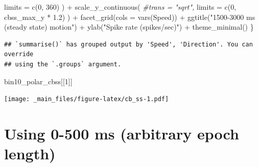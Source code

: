 \documentclass[
]{book}
\newenvironment{Shaded}{\begin{snugshade}}{\end{snugshade}}
\newcommand{\AttributeTok}[1]{\textcolor[rgb]{0.77,0.63,0.00}{#1}}
\newcommand{\CommentTok}[1]{\textcolor[rgb]{0.56,0.35,0.01}{\textit{#1}}}
\newcommand{\DecValTok}[1]{\textcolor[rgb]{0.00,0.00,0.81}{#1}}
\newcommand{\FloatTok}[1]{\textcolor[rgb]{0.00,0.00,0.81}{#1}}
\newcommand{\FunctionTok}[1]{\textcolor[rgb]{0.00,0.00,0.00}{#1}}
\newcommand{\NormalTok}[1]{#1}
\newcommand{\SpecialCharTok}[1]{\textcolor[rgb]{0.00,0.00,0.00}{#1}}
\newcommand{\StringTok}[1]{\textcolor[rgb]{0.31,0.60,0.02}{#1}}
\begin{document}
\begin{Shaded}
\begin{Highlighting}[]
      \AttributeTok{limits =} \FunctionTok{c}\NormalTok{(}\DecValTok{0}\NormalTok{, }\DecValTok{360}\NormalTok{)}
\NormalTok{    ) }\SpecialCharTok{+}
    \FunctionTok{scale\_y\_continuous}\NormalTok{(}
      \CommentTok{\#trans = "sqrt",}
      \AttributeTok{limits =} \FunctionTok{c}\NormalTok{(}\DecValTok{0}\NormalTok{, cbss\_max\_y }\SpecialCharTok{*} \FloatTok{1.2}\NormalTok{)}
\NormalTok{    ) }\SpecialCharTok{+}
    \FunctionTok{facet\_grid}\NormalTok{(}\AttributeTok{cols =} \FunctionTok{vars}\NormalTok{(Speed)) }\SpecialCharTok{+}
    \FunctionTok{ggtitle}\NormalTok{(}\StringTok{"1500{-}3000 ms (steady state) motion"}\NormalTok{) }\SpecialCharTok{+}
    \FunctionTok{ylab}\NormalTok{(}\StringTok{"Spike rate (spikes/sec)"}\NormalTok{) }\SpecialCharTok{+}
    \FunctionTok{theme\_minimal}\NormalTok{()}
\NormalTok{\}}
\end{Highlighting}
\end{Shaded}

\begin{verbatim}
## `summarise()` has grouped output by 'Speed', 'Direction'. You can override
## using the `.groups` argument.
\end{verbatim}

\begin{Shaded}
\begin{Highlighting}[]
\NormalTok{bin10\_polar\_cbss[[}\DecValTok{1}\NormalTok{]]}
\end{Highlighting}
\end{Shaded}

\texttt{[image: \_main\_files/figure-latex/cb\_ss-1.pdf]}

\hypertarget{using-0-500-ms-arbitrary-epoch-length}{%
\section{Using 0-500 ms (arbitrary epoch length)}\label{using-0-500-ms-arbitrary-epoch-length}}
\end{document}
